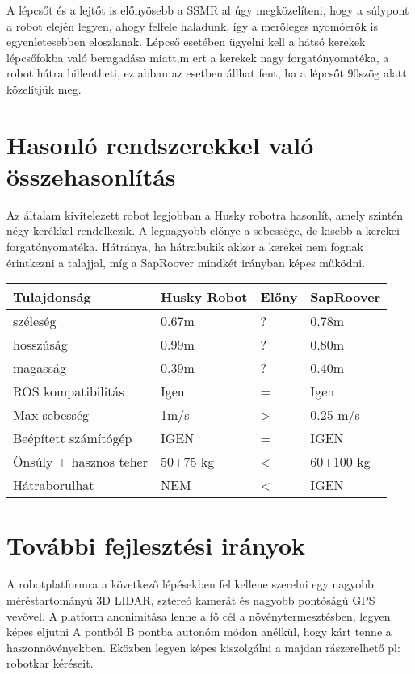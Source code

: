 A lépcsőt és a lejtőt is előnyösebb a SSMR al úgy megközelíteni, hogy a súlypont a robot elején legyen, ahogy felfele haladunk, így a merőleges nyomóerők is egyenletesebben eloszlanak. Lépcső esetében ügyelni kell a hátsó kerekek lépcsőfokba való beragadása miatt,m ert a kerekek nagy forgatónyomatéka, a robot hátra billentheti, ez abban az esetben állhat fent, ha a lépcsőt 90\degree szög alatt közelítjük meg.


\section{Hasonló rendszerekkel való összehasonlítás}

Az általam kivitelezett robot legjobban a Husky robotra hasonlít, amely szintén négy kerékkel rendelkezik. A legnagyobb előnye a sebessége, de kisebb a kerekei forgatónyomatéka. Hátránya, ha hátrabukik akkor a kerekei nem fognak érintkezni a talajjal, míg a SapRoover mindkét irányban képes működni.

\begin{table}[]
\begin{center}
\begin{tabular}{llll}
\hline Tulajdonság & Husky Robot & Előny & SapRoover \\ \hline
 széleség           &    0.67m    &    ?        &   0.78m        \\
   hosszúság        &    0.99m    &   ?        &   0.80m       \\
  magasság           &    0.39m    &   ?        &   0.40m        \\
 ROS 
 kompatibilitás           &    Igen         &   =    &   Igen        \\
   Max sebesség        &    1m/s  &     >   & 0.25 m/s    \\
   Beépített számítógép        &    IGEN  &   =    & IGEN      \\
   Önsúly + hasznos teher & 50+75 kg &  <   & 60+100 kg \\
   Hátraborulhat & NEM &  <   & IGEN \\
\end{tabular}
\end{center}
\end{table}


\section{További fejlesztési irányok}

A robotplatformra a következő lépésekben fel kellene szerelni egy nagyobb méréstartományú 3D LIDAR, sztereó kamerát és nagyobb pontóságú GPS vevővel.
A platform  anonimitása lenne a fő cél a növénytermesztésben, legyen képes eljutni A pontból B pontba autonóm módon anélkül, hogy kárt tenne a haszonnövényekben. Eközben legyen képes kiszolgálni a majdan rászerelhető pl: robotkar kéréseit.

